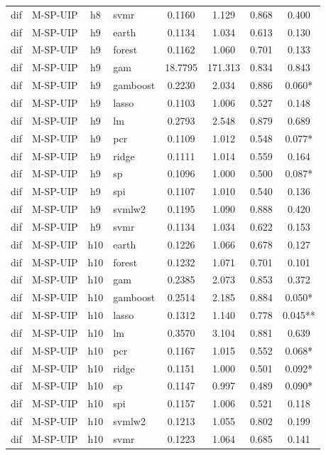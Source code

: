 \begin{ThreePartTable}
\begin{longtable}[t]{llclcccc}
dif & M-SP-UIP & h8 & svmr & 0.1160 & 1.129 & 0.868 & 0.400\\
\addlinespace
dif & M-SP-UIP & h9 & earth & 0.1134 & 1.034 & 0.613 & 0.130\\
dif & M-SP-UIP & h9 & forest & 0.1162 & 1.060 & 0.701 & 0.133\\
dif & M-SP-UIP & h9 & gam & 18.7795 & 171.313 & 0.834 & 0.843\\
dif & M-SP-UIP & h9 & gamboost & 0.2230 & 2.034 & 0.886 & 0.060*\\
dif & M-SP-UIP & h9 & lasso & 0.1103 & 1.006 & 0.527 & 0.148\\
dif & M-SP-UIP & h9 & lm & 0.2793 & 2.548 & 0.879 & 0.689\\
dif & M-SP-UIP & h9 & pcr & 0.1109 & 1.012 & 0.548 & 0.077*\\
dif & M-SP-UIP & h9 & ridge & 0.1111 & 1.014 & 0.559 & 0.164\\
dif & M-SP-UIP & h9 & sp & 0.1096 & 1.000 & 0.500 & 0.087*\\
dif & M-SP-UIP & h9 & spi & 0.1107 & 1.010 & 0.540 & 0.136\\
dif & M-SP-UIP & h9 & svmlw2 & 0.1195 & 1.090 & 0.888 & 0.420\\
dif & M-SP-UIP & h9 & svmr & 0.1134 & 1.034 & 0.622 & 0.153\\
\addlinespace
dif & M-SP-UIP & h10 & earth & 0.1226 & 1.066 & 0.678 & 0.127\\
dif & M-SP-UIP & h10 & forest & 0.1232 & 1.071 & 0.701 & 0.101\\
dif & M-SP-UIP & h10 & gam & 0.2385 & 2.073 & 0.853 & 0.372\\
dif & M-SP-UIP & h10 & gamboost & 0.2514 & 2.185 & 0.884 & 0.050*\\
dif & M-SP-UIP & h10 & lasso & 0.1312 & 1.140 & 0.778 & 0.045**\\
dif & M-SP-UIP & h10 & lm & 0.3570 & 3.104 & 0.881 & 0.639\\
dif & M-SP-UIP & h10 & pcr & 0.1167 & 1.015 & 0.552 & 0.068*\\
dif & M-SP-UIP & h10 & ridge & 0.1151 & 1.000 & 0.501 & 0.092*\\
dif & M-SP-UIP & h10 & sp & 0.1147 & 0.997 & 0.489 & 0.090*\\
dif & M-SP-UIP & h10 & spi & 0.1157 & 1.006 & 0.521 & 0.118\\
dif & M-SP-UIP & h10 & svmlw2 & 0.1213 & 1.055 & 0.802 & 0.199\\
dif & M-SP-UIP & h10 & svmr & 0.1223 & 1.064 & 0.685 & 0.141\\

\end{longtable}
\end{ThreePartTable}
